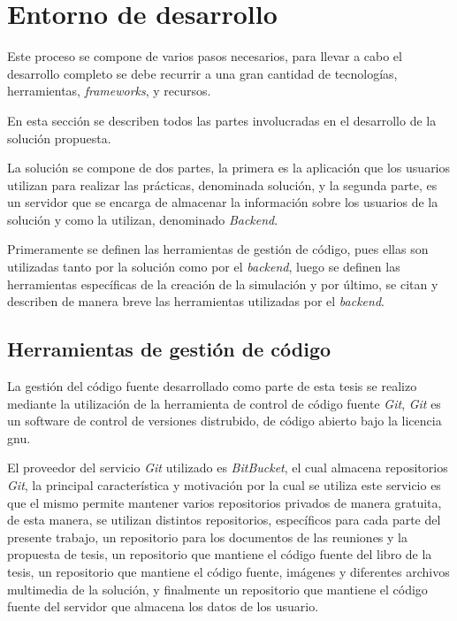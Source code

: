 \section{Entorno de desarrollo}



Este proceso se compone de varios pasos necesarios, para llevar a cabo el
desarrollo completo se debe recurrir a una gran cantidad de tecnologías,
herramientas, \textit{frameworks}, y recursos.

En esta sección se describen todos las partes involucradas en el desarrollo de
la solución propuesta. 

La solución se compone de dos partes, la primera es la aplicación que los
usuarios utilizan para realizar las prácticas, denominada solución, y la segunda
parte, es un servidor que se encarga de almacenar la información sobre los
usuarios de la solución y como la utilizan, denominado \textit{Backend}.

Primeramente se definen las herramientas de gestión de código, pues ellas son
utilizadas tanto por la solución como por el \textit{backend}, luego se definen
las herramientas específicas de la creación de la simulación y por último, se
citan y describen de manera breve las herramientas utilizadas por el
\textit{backend}.

\subsection{Herramientas de gestión de código}

La gestión del código fuente desarrollado como parte de esta tesis se realizo
mediante la utilización de la herramienta de control de código fuente
\textit{Git}, \textit{Git} es un software de control de versiones distrubido, de
código abierto bajo la licencia \Gls{gnu}\cite{git}.

El proveedor del servicio \textit{Git} utilizado es
\textit{BitBucket}\cite{bitbucket}, el cual almacena repositorios \textit{Git},
la principal característica y motivación por la cual se utiliza este servicio es
que el mismo permite mantener varios repositorios privados de manera
gratuita\cite{bitbucket}, de esta manera, se utilizan distintos repositorios,
específicos para cada parte del presente trabajo, un repositorio para los
documentos de las reuniones y la propuesta de tesis, un repositorio que mantiene
el código fuente del libro de la tesis, un repositorio que mantiene el código
fuente, imágenes y diferentes archivos multimedia de la solución, y finalmente
un repositorio que mantiene el código fuente del servidor que almacena los datos
de los usuario.


